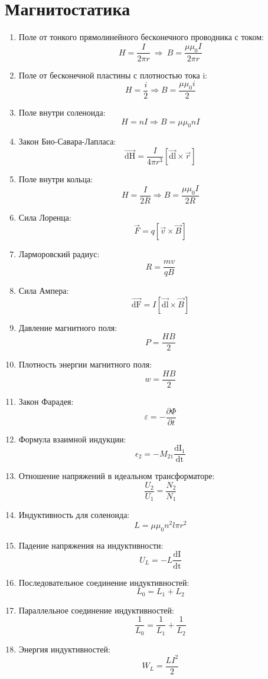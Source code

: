 	\section{Магнитостатика}
		\begin{enumerate}
			\item Поле от тонкого прямолинейного бесконечного проводника с током: \[ H = \frac{I}{2 \pi r} \ \Rightarrow \  B = \frac{\mu \mu_0 I}{2 \pi r} \]
			\item Поле от бесконечной пластины с плотностью тока i: \[ H = \frac{i}{2} \Rightarrow B = \frac{\mu \mu_0 i}{2} \]
			\item Поле внутри соленоида: \[ H = nI \Rightarrow B = \mu \mu_0 nI \]
			\item Закон Био-Савара-Лапласа: \[ \overrightarrow{\mathrm{dH}} = \frac{I}{4 \pi r^3} \left[ \overrightarrow{\mathrm{dl}} \times \overrightarrow{r} \right] \]
			\item Поле внутри кольца: \[ H = \frac{I}{2R} \Rightarrow B = \frac{\mu \mu_0 I}{2R} \]
			\item Сила Лоренца: \[ \overrightarrow{F} = q \left[ \overrightarrow{v} \times \overrightarrow{B} \right] \]
			\item Ларморовский радиус: \[ R = \frac{mv}{qB} \]
			\item Сила Ампера: \[ \overrightarrow{\mathrm{dF}} = I \left[ \overrightarrow{\mathrm{dl}} \times \overrightarrow{B} \right] \]
			\item Давление магнитного поля: \[ P = \frac{HB}{2} \]
			\item Плотность энергии магнитного поля: \[ w = \frac{HB}{2} \]
			\item Закон Фарадея: \[ \varepsilon = - \frac{\partial{\Phi}}{\partial{t}}\]
			\item Формула взаимной индукции: \[ \epsilon_2 = - M_{21} \frac{\mathrm{dI_1}}{\mathrm{dt}} \]
			\item Отношение напряжений в идеальном трансформаторе: \[ \frac{U_2}{U_1} = \frac{N_2}{N_1} \]
			\item Индуктивность для соленоида: \[ L = \mu \mu_0 n^2 l \pi r^2 \]
			\item Падение напряжения на индуктивности: \[ U_L = -L \frac{\mathrm{dI}}{\mathrm{dt}} \]
			\item Последовательное соединение индуктивностей: \[ L_0 = L_1 + L_2 \]
			\item Параллельное соединение индуктивностей: \[ \frac{1}{L_0} = \frac{1}{L_1} + \frac{1}{L_2} \]
			\item Энергия индуктивностей: \[ W_L = \frac{LI^2}{2} \]
		\end{enumerate}
		
